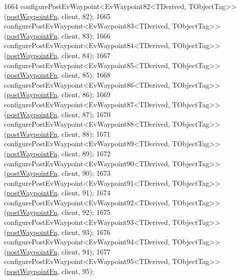 \begin{DoxyCode}
1664     configurePostEvWaypoint<EvWaypoint82<TDerived, TObjectTag>>(\hyperlink{classmove__base__z__client_1_1WaypointEventDispatcher_acc538eb7506c13f7cca2268a1742dadd}{postWaypointFn}, client, 82);
1665     configurePostEvWaypoint<EvWaypoint83<TDerived, TObjectTag>>(\hyperlink{classmove__base__z__client_1_1WaypointEventDispatcher_acc538eb7506c13f7cca2268a1742dadd}{postWaypointFn}, client, 83);
1666     configurePostEvWaypoint<EvWaypoint84<TDerived, TObjectTag>>(\hyperlink{classmove__base__z__client_1_1WaypointEventDispatcher_acc538eb7506c13f7cca2268a1742dadd}{postWaypointFn}, client, 84);
1667     configurePostEvWaypoint<EvWaypoint85<TDerived, TObjectTag>>(\hyperlink{classmove__base__z__client_1_1WaypointEventDispatcher_acc538eb7506c13f7cca2268a1742dadd}{postWaypointFn}, client, 85);
1668     configurePostEvWaypoint<EvWaypoint86<TDerived, TObjectTag>>(\hyperlink{classmove__base__z__client_1_1WaypointEventDispatcher_acc538eb7506c13f7cca2268a1742dadd}{postWaypointFn}, client, 86);
1669     configurePostEvWaypoint<EvWaypoint87<TDerived, TObjectTag>>(\hyperlink{classmove__base__z__client_1_1WaypointEventDispatcher_acc538eb7506c13f7cca2268a1742dadd}{postWaypointFn}, client, 87);
1670     configurePostEvWaypoint<EvWaypoint88<TDerived, TObjectTag>>(\hyperlink{classmove__base__z__client_1_1WaypointEventDispatcher_acc538eb7506c13f7cca2268a1742dadd}{postWaypointFn}, client, 88);
1671     configurePostEvWaypoint<EvWaypoint89<TDerived, TObjectTag>>(\hyperlink{classmove__base__z__client_1_1WaypointEventDispatcher_acc538eb7506c13f7cca2268a1742dadd}{postWaypointFn}, client, 89);
1672     configurePostEvWaypoint<EvWaypoint90<TDerived, TObjectTag>>(\hyperlink{classmove__base__z__client_1_1WaypointEventDispatcher_acc538eb7506c13f7cca2268a1742dadd}{postWaypointFn}, client, 90);
1673     configurePostEvWaypoint<EvWaypoint91<TDerived, TObjectTag>>(\hyperlink{classmove__base__z__client_1_1WaypointEventDispatcher_acc538eb7506c13f7cca2268a1742dadd}{postWaypointFn}, client, 91);
1674     configurePostEvWaypoint<EvWaypoint92<TDerived, TObjectTag>>(\hyperlink{classmove__base__z__client_1_1WaypointEventDispatcher_acc538eb7506c13f7cca2268a1742dadd}{postWaypointFn}, client, 92);
1675     configurePostEvWaypoint<EvWaypoint93<TDerived, TObjectTag>>(\hyperlink{classmove__base__z__client_1_1WaypointEventDispatcher_acc538eb7506c13f7cca2268a1742dadd}{postWaypointFn}, client, 93);
1676     configurePostEvWaypoint<EvWaypoint94<TDerived, TObjectTag>>(\hyperlink{classmove__base__z__client_1_1WaypointEventDispatcher_acc538eb7506c13f7cca2268a1742dadd}{postWaypointFn}, client, 94);
1677     configurePostEvWaypoint<EvWaypoint95<TDerived, TObjectTag>>(\hyperlink{classmove__base__z__client_1_1WaypointEventDispatcher_acc538eb7506c13f7cca2268a1742dadd}{postWaypointFn}, client, 95);

\end{DoxyCode}
